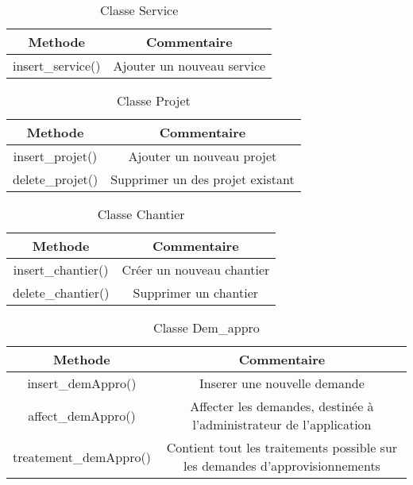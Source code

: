 \documentclass{report}
\begin{document}
\begin{table}[h!]
    \begin{center}
        \begin{tabular}{|c|c|}
            \hline
            \textbf{Methode} & \textbf{Commentaire}  \\
            \hline
            insert\_service() & Ajouter un nouveau service \\
            \hline
        \end{tabular}
    \end{center}
\caption{Classe Service}
\end{table}

\begin{table}[h!]
    \begin{center}
        \begin{tabular}{|c|c|}
            \hline
            \textbf{Methode} & \textbf{Commentaire}  \\
            \hline
            insert\_projet() & Ajouter un nouveau projet\\
            \hline
            delete\_projet()  & Supprimer un des projet existant\\
            \hline
        \end{tabular}
    \end{center}
\caption{Classe Projet}
\end{table}

\begin{table}[h!]
    \begin{center}
        \begin{tabular}{|c|c|}
            \hline
            \textbf{Methode} & \textbf{Commentaire}  \\
            \hline
            insert\_chantier() & Créer un nouveau chantier\\
            \hline
            delete\_chantier()  & Supprimer un chantier\\
            \hline
        \end{tabular}
    \end{center}
\caption{Classe Chantier}
\end{table}

\begin{table}[h!]
    \begin{center}
        \begin{tabular}{|c|c|}
            \hline
            \textbf{Methode} & \textbf{Commentaire}  \\
            \hline
            insert\_demAppro() & Inserer une nouvelle demande\\
            \hline
            affect\_demAppro()  & Affecter les demandes, destinée à l'administrateur de l'application\\
            \hline
            treatement\_demAppro()  & Contient tout les traitements possible sur les demandes d'approvisionnements\\
            \hline
        \end{tabular}
    \end{center}
\caption{Classe Dem\_appro}
\end{table}
\end{document}
